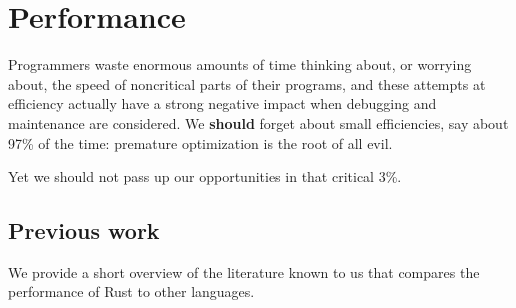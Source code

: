 \documentclass[british]{scrreprt}
\begin{document}
\chapter{Performance}
\label{ch:performance}
\begin{displayquote}
	Programmers waste enormous amounts of time thinking about, or worrying about, the speed of noncritical parts of their programs, and these attempts at efficiency actually have a strong negative impact when debugging and maintenance are considered. We \textbf{should} forget about small efficiencies, say about 97\% of the time: premature optimization is the root of all evil.

	Yet we should not pass up our opportunities in that critical 3\%.
\end{displayquote}

\section{Previous work}
We provide a short overview of the literature known to us that compares the performance of Rust to other languages.
\end{document}
